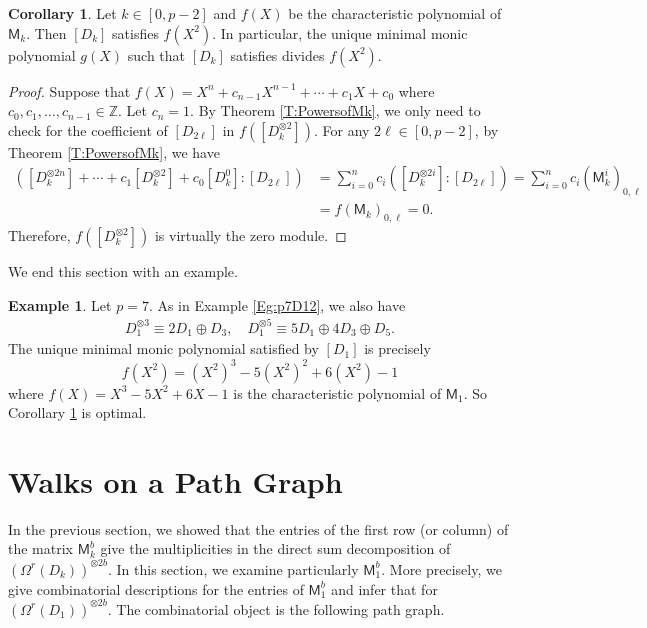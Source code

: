 \documentclass[12pt,reqno]{amsart}
\newcommand{\Z}{\mathbb{Z}}
\newcommand{\M}{\mathsf{M}}
\theoremstyle{definition}
\newtheorem{cor}[thm]{Corollary}
\newtheorem{eg}[thm]{Example}
\numberwithin{equation}{section}
\begin{document}
\begin{cor}\label{C:charpoly}
Let $k\in [0,p-2]$ and $f(X)$ be the characteristic polynomial of $\M_k$. Then $[D_k]$ satisfies $f(X^2)$. In particular, the unique minimal monic polynomial $g(X)$ such that $[D_k]$ satisfies divides $f(X^2)$. 
\end{cor}
\begin{proof} Suppose that $f(X)=X^n+c_{n-1}X^{n-1}+\cdots+c_1X+c_0$ where $c_0,c_1,\ldots,c_{n-1}\in\Z$. Let $c_n=1$. By Theorem \ref{T:PowersofMk}, we only need to check for the coefficient of $[D_{2\ell}]$ in $f([D_k^{\otimes 2}])$. For any $2\ell\in [0,p-2]$, by Theorem \ref{T:PowersofMk}, we have 
\begin{align*}
  ([D_k^{\otimes 2n}]+\cdots+c_1[D_k^{\otimes 2}]+c_0[D_k^0]: [D_{2\ell}])&=\sum_{i=0}^nc_i([D_k^{\otimes 2i}]:[D_{2\ell}])=\sum_{i=0}^nc_i(\M_k^{i})_{0,\ell}\\
  &=f(\M_k)_{0,\ell}=0.
\end{align*} Therefore, $f([D_k^{\otimes 2}])$ is virtually the zero module. %
\end{proof}

We end this section with an example. 

\begin{eg}
  Let $p=7$. As in Example \ref{Eg:p7D12}, we also have 
  \begin{align*}
    D_1^{\otimes 3}\equiv 2D_1 \oplus D_3, \quad D_1^{\otimes 5}\equiv 5D_1\oplus 4D_3\oplus D_5.
  \end{align*} The unique minimal monic polynomial satisfied by $[D_1]$ is precisely \[f(X^2)=(X^2)^3-5(X^2)^2+6(X^2)-1\] where $f(X)=X^3-5X^2+6X-1$ is the characteristic polynomial of $\M_1$. So Corollary \ref{C:charpoly} is optimal. 
\end{eg}

\section{Walks on a Path Graph}\label{S:Path}

In the previous section, we showed that the entries of the first row (or column) of the matrix $\M_k^b$ give the multiplicities in the direct sum decomposition of $(\Omega^r(D_k))^{\otimes 2b}$. In this section, we examine particularly $\M_1^b$. More precisely, we give combinatorial descriptions for the entries of $\M_1^b$ and infer that for $(\Omega^r(D_1))^{\otimes 2b}$. The combinatorial object is the following path graph. 
\end{document}
